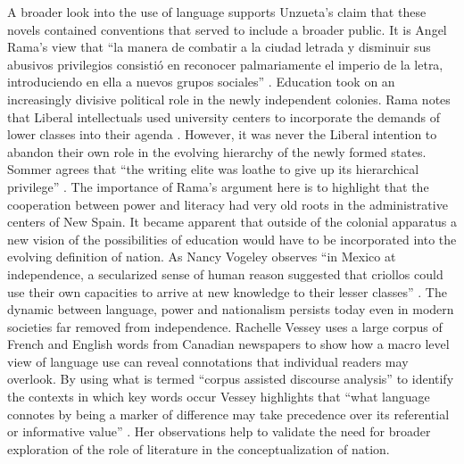 \documentclass[12pt]{report}
\begin{document}
A broader look into the use of language supports Unzueta's claim that these novels contained conventions that served to include a broader public. 
It is Angel Rama's view that \enquote{la manera de combatir a la ciudad letrada y disminuir sus abusivos privilegios consistió en reconocer palmariamente el imperio de la letra, introduciendo en ella a nuevos grupos sociales} \autocite[72]{Rama2002}. 
Education took on an increasingly divisive political role in the newly independent colonies. 
Rama notes that Liberal intellectuals used university centers to incorporate the demands of lower classes into their agenda \autocite[75]{Rama2002}. 
However, it was never the Liberal intention to abandon their own role in the evolving hierarchy of the newly formed states. 
Sommer agrees that \enquote{the writing elite was loathe to give up its hierarchical privilege} \autocite[51]{Sommer1991}. 
The importance of Rama's argument here is to highlight that the cooperation between power and literacy had very old roots in the administrative centers of New Spain. 
It became apparent that outside of the colonial apparatus a new vision of the possibilities of education would have to be incorporated into the evolving definition of nation. 
As Nancy Vogeley observes \enquote{in Mexico at independence, a secularized sense of human reason suggested that criollos could use their own capacities to arrive at new knowledge to their lesser classes} \autocite[135]{Vogeley2001}. 
The dynamic between language, power and nationalism persists today even in modern societies far removed from independence. 
Rachelle Vessey uses a large corpus of French and English words from Canadian newspapers to show how a macro level view of language use can reveal connotations that individual readers may overlook. 
By using what is termed \enquote{corpus assisted discourse analysis} to identify the contexts in which key words occur Vessey highlights that \enquote{what language connotes by being a marker of difference may take precedence over its referential or informative value} \autocite[177]{Vessey2014}. 
Her observations help to validate the need for broader exploration of the role of literature in the conceptualization of nation. 
\end{document}
